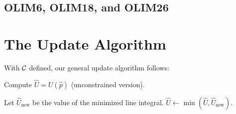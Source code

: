 \documentclass[eikonal.tex]{subfiles}
\begin{document}
\subsection{OLIM6, OLIM18, and OLIM26}

\section{The Update Algorithm}

With $\mathcal{C}$ defined, our general update algorithm follows:

\begin{algorithm}[H]
  \caption{Compute $\hat{U} = U(\hat{p})$ (unconstrained version).}
  \begin{algorithmic}
          \STATE{} Let $\hat{U}_{\operatorname{new}}$ be the value of the minimized line integral.
          \STATE{} $\hat{U} \gets \min(\hat{U}, \hat{U}_{\operatorname{new}})$.
        \ENDIF{}
      \ENDFOR{}
    \ENDFOR{}
  \end{algorithmic}
\end{algorithm}
\end{document}
